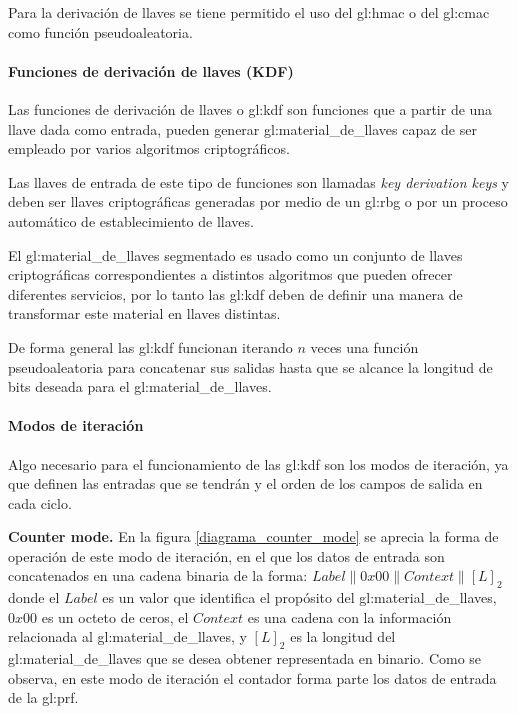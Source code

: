Para la derivación de llaves se tiene permitido el uso del \gls{gl:hmac} o 
del \gls{gl:cmac} como función pseudoaleatoria.

\paragraph{Funciones de derivación de llaves (KDF)}

Las funciones de derivación de llaves o \gls{gl:kdf} son funciones que a 
partir de una llave dada como entrada, pueden generar 
\gls{gl:material_de_llaves} capaz de ser empleado por varios algoritmos 
criptográficos. 

Las llaves de entrada de este tipo de funciones son llamadas \textit{key 
derivation keys} y deben ser llaves criptográficas generadas por medio de un 
\gls{gl:rbg} o por un proceso automático de establecimiento de llaves.

El \gls{gl:material_de_llaves} segmentado es usado como un conjunto de llaves 
criptográficas correspondientes a distintos algoritmos que pueden ofrecer 
diferentes servicios, por lo tanto las \gls{gl:kdf} deben de definir una 
manera de transformar este material en llaves distintas.

De forma general las \gls{gl:kdf} funcionan iterando $n$ veces una función 
pseudoaleatoria para concatenar sus salidas hasta que se alcance la longitud 
de bits deseada para el \gls{gl:material_de_llaves}.

\paragraph{Modos de iteración}

Algo necesario para el funcionamiento de las \gls{gl:kdf} son los modos de 
iteración, ya que definen las entradas que se tendrán y el orden de los campos 
de salida en cada ciclo.

\textbf{Counter mode.}
En la figura \ref{diagrama_counter_mode} se aprecia la forma de operación de 
este modo de iteración, en el que los datos de entrada son concatenados en una 
cadena binaria de la forma: $Label \parallel 0x00 \parallel Context \parallel 
{[L]}_2$ donde el $Label$ es un valor que identifica el propósito del 
\gls{gl:material_de_llaves}, $0x00$ es un octeto de ceros, el $Context$ es una 
cadena con la información relacionada al \gls{gl:material_de_llaves}, y 
${[L]}_2$ es la longitud del \gls{gl:material_de_llaves} que se desea obtener 
representada en binario. Como se observa, en este modo de iteración el 
contador forma parte los datos de entrada de la \gls{gl:prf}.

